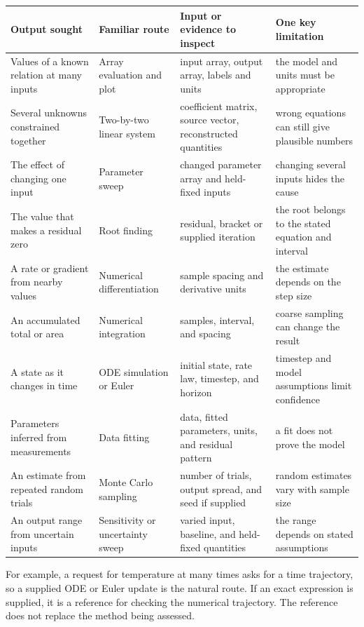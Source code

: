 \documentclass[11pt,a4paper]{article}
\begin{document}
\begin{center}\small
\begin{tabular}{>{\raggedright\arraybackslash}p{.25\linewidth}>{\raggedright\arraybackslash}p{.20\linewidth}>{\raggedright\arraybackslash}p{.25\linewidth}>{\raggedright\arraybackslash}p{.20\linewidth}}
\toprule
\textbf{Output sought} & \textbf{Familiar route} & \textbf{Input or evidence to inspect} & \textbf{One key limitation} \\
\midrule
Values of a known relation at many inputs & Array evaluation and plot & input array, output array, labels and units & the model and units must be appropriate \\
Several unknowns constrained together & Two-by-two linear system & coefficient matrix, source vector, reconstructed quantities & wrong equations can still give plausible numbers \\
The effect of changing one input & Parameter sweep & changed parameter array and held-fixed inputs & changing several inputs hides the cause \\
The value that makes a residual zero & Root finding & residual, bracket or supplied iteration & the root belongs to the stated equation and interval \\
A rate or gradient from nearby values & Numerical differentiation & sample spacing and derivative units & the estimate depends on the step size \\
An accumulated total or area & Numerical integration & samples, interval, and spacing & coarse sampling can change the result \\
A state as it changes in time & ODE simulation or Euler & initial state, rate law, timestep, and horizon & timestep and model assumptions limit confidence \\
Parameters inferred from measurements & Data fitting & data, fitted parameters, units, and residual pattern & a fit does not prove the model \\
An estimate from repeated random trials & Monte Carlo sampling & number of trials, output spread, and seed if supplied & random estimates vary with sample size \\
An output range from uncertain inputs & Sensitivity or uncertainty sweep & varied input, baseline, and held-fixed quantities & the range depends on stated assumptions \\
\bottomrule
\end{tabular}
\end{center}

For example, a request for temperature at many times asks for a time trajectory, so a supplied ODE or Euler update is the natural route. If an exact expression is supplied, it is a reference for checking the numerical trajectory. The reference does not replace the method being assessed.
\end{document}
